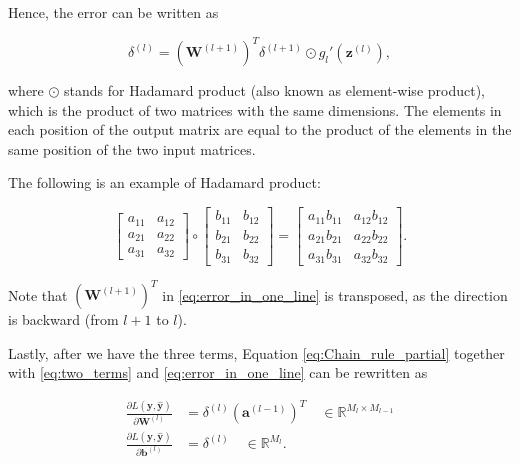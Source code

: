 \documentclass[
	parskip, 			   %
	twoside, 			   %
	DIV=14, 			   %
	BCOR=15.0mm, 		   %
	headsepline, 		   %
	open=right, 		   %
	captions=tableheading, %
	bibliography=totoc,    %
	numbers=noenddot       %
]{scrreprt}
\begin{document}
Hence, the error can be written as

\begin{equation}
    \label{eq:error_in_one_line}
        \delta^{(l)} = (\mathbf{W}^{(l+1)})^T \delta^{(l+1)} \odot g_{l}'(\mathbf{z}^{(l)}),
\end{equation}

where $\odot$ stands for Hadamard product (also known as element-wise product), which is the product of two matrices with the same dimensions. The elements in each position of the output matrix are equal to the product of the elements in the same position of the two input matrices. 

The following is an example of Hadamard product:

\begin{equation}
    \label{eq:Hadamard_product}
\left[\begin{array}{ll}
a_{11} & a_{12}  \\
a_{21} & a_{22} \\
a_{31} & a_{32} 
\end{array}\right] \circ\left[\begin{array}{ll}
b_{11} & b_{12}  \\
b_{21} & b_{22}\\
b_{31} & b_{32} 
\end{array}\right]=\left[\begin{array}{ll}
a_{11} b_{11} & a_{12} b_{12} \\
a_{21} b_{21} & a_{22} b_{22}  \\
a_{31} b_{31} & a_{32} b_{32} 
\end{array}\right].
\end{equation}

Note that $(\mathbf{W}^{(l+1)})^T$ in \ref{eq:error_in_one_line} is transposed, as the direction is backward (from $l+1$ to $l$).

Lastly, after we have the three terms, Equation \ref{eq:Chain_rule_partial} together with \ref{eq:two_terms} and \ref{eq:error_in_one_line} can be rewritten as

\begin{equation}
    \label{eq:Chain_rule_partial_deducted}
    \begin{aligned}
        \frac{\partial L\left( \mathbf{y}, \hat{\mathbf{y}} \right)}{\partial \mathbf{W}^{(l)}} &= \delta^{(l)} (\mathbf{a}^{(l-1)})^T \quad \in \mathbb{R}^{M_{l} \times M_{l-1}}
        \\
        \frac{\partial L\left( \mathbf{y}, \hat{\mathbf{y}} \right)}{\partial \mathbf{b}^{(l)}} &= \delta^{(l)} \quad \in \mathbb{R}^{M_{l}}.
    \end{aligned}
\end{equation}
\end{document}
